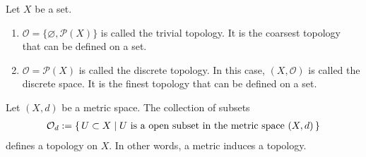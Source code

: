 %
\begin{exmbox}
    \begin{example}
        Let \(X\) be a {\color{mathif}set}.
        \begin{enumerate}
            \item \(\mathcal{O} = \{\varnothing, \mathcal{P}(X)\}\) is called the {\color{maththen}trivial topology}. It is the coarsest topology that can be defined on a set.
            \item \(\mathcal{O} = \mathcal{P}(X)\) is called the {\color{maththen}discrete topology}. In this case, \((X, \mathcal{O})\) is called the {\color{maththen}discrete space}. It is the {\color{mathrem}finest topology} that can be defined on a set.
        \end{enumerate}
    \end{example}
\end{exmbox}

\begin{thmbox}
    \begin{proposition}
        Let \((X, d)\) be a metric space. The collection of subsets
        \begin{align*}
            \mathcal{O}_d := \left\{\, U \subset X \mid U \text{ is a open subset in the metric space } (X, d) \,\right\}
        \end{align*}
        defines a topology on \(X\). In other words, a metric induces a topology.
    \end{proposition}
\end{thmbox}

